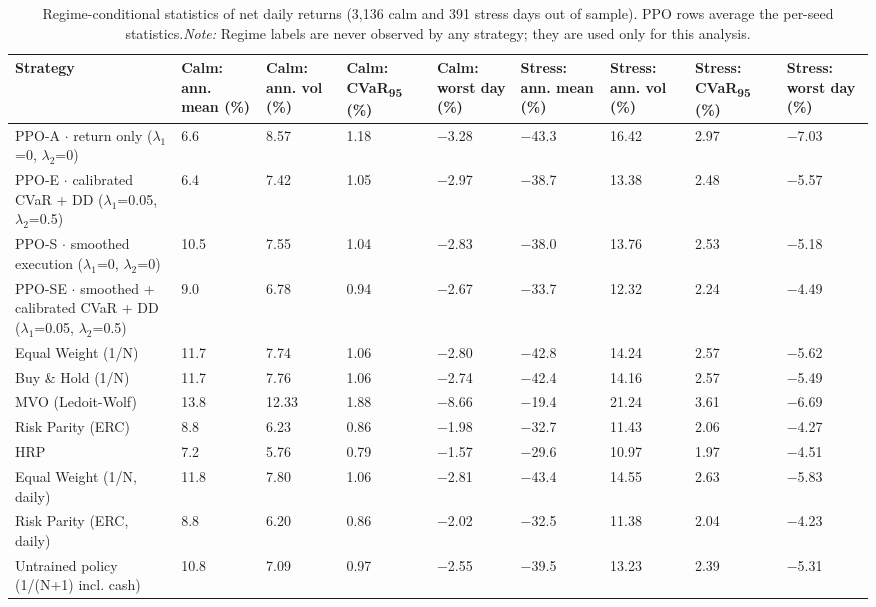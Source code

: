 \documentclass[11pt]{article}
\begin{document}
\begin{table}[!htbp]
\centering\scriptsize
\caption{Regime-conditional statistics of net daily returns (3,136 calm and 391 stress days out of sample). PPO rows average the per-seed statistics.\label{tab-regime-no} \emph{Note:} Regime labels are never observed by any strategy; they are used only for this analysis.}
\begin{adjustbox}{max width=\linewidth}
\begin{tabular}{@{}lllllllll@{}}
\toprule
Strategy & Calm: ann. mean (\%) & Calm: ann. vol (\%) & Calm: CVaR\textsubscript{95} (\%) & Calm: worst day (\%) & Stress: ann. mean (\%) & Stress: ann. vol (\%) & Stress: CVaR\textsubscript{95} (\%) & Stress: worst day (\%) \\
\midrule
PPO-A $\cdot$ return only {($\lambda_1$=0, $\lambda_2$=0)} & 6.6 & 8.57 & 1.18 & $-$3.28 & $-$43.3 & 16.42 & 2.97 & $-$7.03 \\
PPO-E $\cdot$ calibrated CVaR + DD {($\lambda_1$=0.05, $\lambda_2$=0.5)} & 6.4 & 7.42 & 1.05 & $-$2.97 & $-$38.7 & 13.38 & 2.48 & $-$5.57 \\
PPO-S $\cdot$ smoothed execution {($\lambda_1$=0, $\lambda_2$=0)} & 10.5 & 7.55 & 1.04 & $-$2.83 & $-$38.0 & 13.76 & 2.53 & $-$5.18 \\
PPO-SE $\cdot$ smoothed + calibrated CVaR + DD {($\lambda_1$=0.05, $\lambda_2$=0.5)} & 9.0 & 6.78 & 0.94 & $-$2.67 & $-$33.7 & 12.32 & 2.24 & $-$4.49 \\
Equal Weight (1/N) & 11.7 & 7.74 & 1.06 & $-$2.80 & $-$42.8 & 14.24 & 2.57 & $-$5.62 \\
Buy \& Hold (1/N) & 11.7 & 7.76 & 1.06 & $-$2.74 & $-$42.4 & 14.16 & 2.57 & $-$5.49 \\
MVO (Ledoit-Wolf) & 13.8 & 12.33 & 1.88 & $-$8.66 & $-$19.4 & 21.24 & 3.61 & $-$6.69 \\
Risk Parity (ERC) & 8.8 & 6.23 & 0.86 & $-$1.98 & $-$32.7 & 11.43 & 2.06 & $-$4.27 \\
HRP & 7.2 & 5.76 & 0.79 & $-$1.57 & $-$29.6 & 10.97 & 1.97 & $-$4.51 \\
Equal Weight (1/N, daily) & 11.8 & 7.80 & 1.06 & $-$2.81 & $-$43.4 & 14.55 & 2.63 & $-$5.83 \\
Risk Parity (ERC, daily) & 8.8 & 6.20 & 0.86 & $-$2.02 & $-$32.5 & 11.38 & 2.04 & $-$4.23 \\
Untrained policy (1/(N+1) incl. cash) & 10.8 & 7.09 & 0.97 & $-$2.55 & $-$39.5 & 13.23 & 2.39 & $-$5.31 \\
\bottomrule
\end{tabular}
\end{adjustbox}
\end{table}
\end{document}
